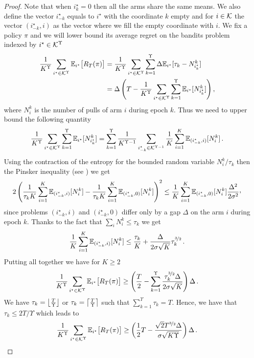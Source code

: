 \begin{proof}
Note that when $i^\star_k = 0$ then all the arms share the same means. We also define the vector $i^\star_{-k}$ equals to $i^\star$ with the coordinate $k$ empty and for $i\in\mathcal{K}$ the vector $(i^\star_{-k},i)$ as the vector where we fill the empty coordinate with $i$.  We fix a policy $\pi$ and we will lower bound its average regret on the bandits problem indexed by $i^\star \in \mathcal{K}^\Upsilon$ 
\begin{align*}
    \frac{1}{K^{\Upsilon}} \sum_{i^\star\in \mathcal{K}^{\Upsilon}}  \mathbb{E}_{i^\star}\big[R_T(\pi)\big] &= \frac{1}{K^{\Upsilon}} \sum_{i^\star\in \mathcal{K}^{\Upsilon}} \sum_{k=1}^{\Upsilon}\Delta \mathbb{E}_{i^\star}[\tau_k - N_{i^\star_k}^k] \\
    &=\Delta \left(T - \frac{1}{K^{\Upsilon}} \sum_{i^\star\in \mathcal{K}^{\Upsilon}} \sum_{k=1}^{\Upsilon} \mathbb{E}_{i^\star}[N_{i^\star_k}^k]\right),
\end{align*}
where $N_i^k$ is the number of pulls of arm $i$ during epoch $k$. Thus we need to upper bound the following quantity
\[
\frac{1}{K^{\Upsilon}} \sum_{i^\star\in \mathcal{K}^{\Upsilon}} \sum_{k=1}^{\Upsilon} \mathbb{E}_{i^\star}[N_{i^\star_k}^k] = \sum_{k=1}^{\Upsilon} \frac{1}{K^{\Upsilon-1}} \sum_{i^\star_{-k}\in \mathcal{K}^{\Upsilon-1}}\frac{1}{K} \sum_{i=1}^K\mathbb{E}_{(i^\star_{-k},i)}[N_{i}^k]\,.
\]
Using the contraction of the entropy for the bounded random variable $N_{i}^k/\tau_k$ then the Pinsker inequality (see \citet{garivier2018explore}) we get
\[
2\left(\frac{1}{\tau_k K} \sum_{i=1}^K\EEempty_{(i^\star_{-k},i)}[N_{i}^k] -\frac{1}{\tau_k K} \sum_{i=1}^K\EEempty_{(i^\star_{-k},0)}[N_{i}^k] \right)^2 \leq \frac{1}{K} \sum_{i=1}^K \EEempty_{(i^\star_{-k},0)}[N_{i}^k] \frac{\Delta^2}{2\sigma^2}\CommaBin
\]
since problems $(i^\star_{-k},i)$ and $(i^\star_{-k},0)$ differ only by a gap $\Delta$ on the arm $i$ during epoch $k$. Thanks to the fact that  $\sum_i N_i^k \leq \tau_k$ we get 
\[
\frac{1}{K} \sum_{i=1}^K\mathbb{E}_{(i^\star_{-k},i)}[N_{i}^k] \leq \frac{\tau_k}{K} + \frac{\Delta}{2\sigma \sqrt{K}}\tau_k^{\nicefrac{3}{2}}\,.
\]
Putting all together we have for $K\geq 2$
\begin{align*}
    \frac{1}{K^{\Upsilon}} \sum_{i^\star\in \mathcal{K}^{\Upsilon}}  \mathbb{E}_{i^\star}\big[R_T(\pi)\big]  \geq \left(\frac{T}{2} -  \sum_{k=1}^{\Upsilon} \frac{\tau_k^{\nicefrac{3}{2}} \Delta}{2\sigma \sqrt{K}}\right)\Delta\,.
\end{align*}
We have $\tau_k= \left\lfloor\frac{T}{\Upsilon}\right\rfloor$ or $\tau_k= \left\lceil\frac{T}{\Upsilon}\right\rceil$  such that $\sum_{k=1}^{\Upsilon} \tau_k=T$. Hence, we have that $\tau_k \leq 2T/\Upsilon$ which leads to 
\[
 \frac{1}{K^{\Upsilon}} \sum_{i^\star\in \mathcal{K}^{\Upsilon}}  \mathbb{E}_{i^\star}\big[R_T(\pi)\big]  \geq  \left(\frac{1}{2}T - \frac{\sqrt{2}T^{\nicefrac{3}{2}}\Delta}{\sigma \sqrt{K\Upsilon}}\right)\Delta\,.
\]


\end{proof}
